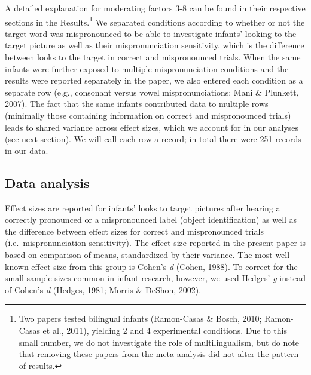 \documentclass[man]{apa6}
\let\rmarkdownfootnote\footnote%
\def\footnote{\protect\rmarkdownfootnote}
\theoremstyle{definition}
\theoremstyle{definition}
\theoremstyle{definition}
\theoremstyle{remark}
\begin{document}
A detailed explanation for moderating factors 3-8 can be found in their
respective sections in the Results.\footnote{Two papers tested bilingual
  infants (Ramon-Casas \& Bosch, 2010; Ramon-Casas et al., 2011),
  yielding 2 and 4 experimental conditions. Due to this small number, we
  do not investigate the role of multilingualism, but do note that
  removing these papers from the meta-analysis did not alter the pattern
  of results.} We separated conditions according to whether or not the
target word was mispronounced to be able to investigate infants' looking
to the target picture as well as their mispronunciation sensitivity,
which is the difference between looks to the target in correct and
mispronounced trials. When the same infants were further exposed to
multiple mispronunciation conditions and the results were reported
separately in the paper, we also entered each condition as a separate
row (e.g., consonant versus vowel mispronunciations; Mani \& Plunkett,
2007). The fact that the same infants contributed data to multiple rows
(minimally those containing information on correct and mispronounced
trials) leads to shared variance across effect sizes, which we account
for in our analyses (see next section). We will call each row a record;
in total there were 251 records in our data.

\subsection{Data analysis}\label{data-analysis}

Effect sizes are reported for infants' looks to target pictures after
hearing a correctly pronounced or a mispronounced label (object
identification) as well as the difference between effect sizes for
correct and mispronounced trials (i.e.~mispronunciation sensitivity).
The effect size reported in the present paper is based on comparison of
means, standardized by their variance. The most well-known effect size
from this group is Cohen's \emph{d} (Cohen, 1988). To correct for the
small sample sizes common in infant research, however, we used Hedges'
\emph{g} instead of Cohen's \emph{d} (Hedges, 1981; Morris \& DeShon,
2002).
\end{document}
